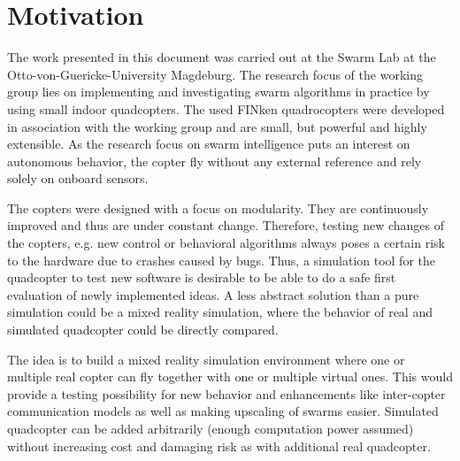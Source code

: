 

\section{Motivation}
\label{sec:motivation}
The work presented in this document was carried out at the Swarm Lab at the Otto-von-Guericke-University Magdeburg. 
The research focus of the working group lies on implementing and investigating swarm algorithms in practice by using small indoor quadcopters. 
The used FINken quadrocopters were developed in association with the working group and are small, but powerful and highly extensible. 
As the research focus on swarm intelligence puts an interest on autonomous behavior, the copter fly without any external reference and rely solely on onboard sensors.

The copters were designed with a focus on modularity.
They are continuously improved and thus are under constant change. 
Therefore, testing new changes of the copters, e.g. new control or behavioral algorithms always poses a certain risk to the hardware due to crashes caused by bugs. 
Thus, a simulation tool for the quadcopter to test new software is desirable to be able to do a safe first evaluation of newly implemented ideas. 
A less abstract solution than a pure simulation could be a mixed reality simulation, where the behavior of real and simulated quadcopter could be directly compared.

The idea is to build a mixed reality simulation environment where one or multiple real copter can fly together with one or multiple virtual ones. 
This would provide a testing possibility for new behavior and enhancements like inter-copter communication models as well as making upscaling of swarms easier. 
Simulated quadcopter can be added arbitrarily (enough computation power assumed) without increasing cost and damaging risk as with additional real quadcopter. 

